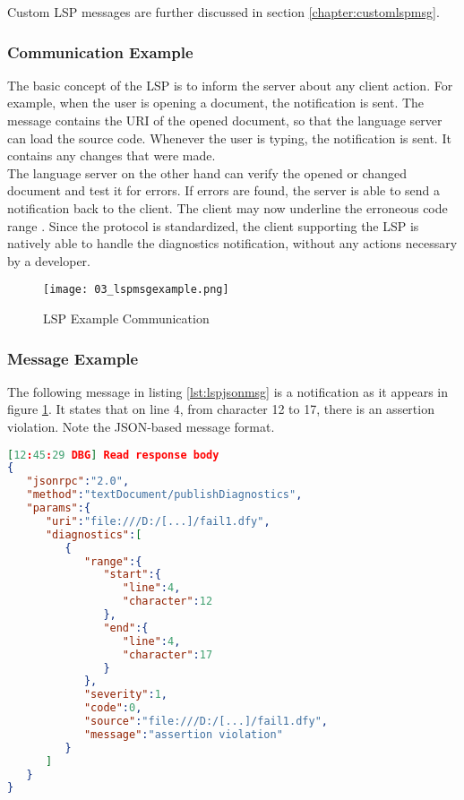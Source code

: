 Custom LSP messages are further discussed in section \ref{chapter:customlspmsg}.

\subsubsection{Communication Example}
The basic concept of the LSP is to inform the server about any client action.
For example, when the user is opening a document, the notification  is sent.
The message contains the URI of the opened document, so that the language server can load the source code. 
Whenever the user is typing, the notification  is sent.
It contains any changes that were made.\\

The language server on the other hand can verify the opened or changed document and test it for errors.
If errors are found, the server is able to send a  notification back to the client.
The client may now underline the erroneous code range \cite{lspspec}.
Since the protocol is standardized, the client supporting the LSP is natively able to handle the diagnostics notification, without any actions necessary by a developer.

\begin{figure}[H]
    \centering
    \texttt{[image: 03\_lspmsgexample.png]}
    \caption{LSP Example Communication}
    \label{fig:lspmsgexample}
\end{figure}

\pagebreak

\subsubsection{Message Example}
The following message in listing \ref{lst:lspjsonmsg} is a  notification as it appears in figure \ref{fig:lspmsgexample}.
It states that on line 4, from character 12 to 17, there is an assertion violation.
Note the JSON-based message format.\\

\begin{lstlisting}[language=json, caption={LSP Message Example}, captionpos=b, label={lst:lspjsonmsg}]
[12:45:29 DBG] Read response body
{
   "jsonrpc":"2.0",
   "method":"textDocument/publishDiagnostics",
   "params":{
      "uri":"file:///D:/[...]/fail1.dfy",
      "diagnostics":[
         {
            "range":{
               "start":{
                  "line":4,
                  "character":12
               },
               "end":{
                  "line":4,
                  "character":17
               }
            },
            "severity":1,
            "code":0,
            "source":"file:///D:/[...]/fail1.dfy",
            "message":"assertion violation"
         }
      ]
   }
}
\end{lstlisting}

